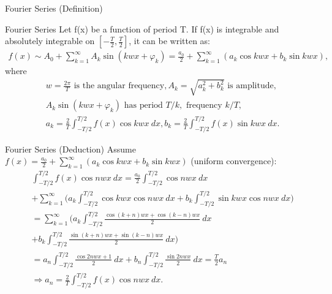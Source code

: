 \documentclass{beamer}
\begin{document}
	\begin{frame}{Fourier Series (Definition)}
		\begin{block}{Fourier Series}
			Let f(x) be a function of period T. If f(x) is integrable and absolutely integrable on $[-\frac{T}{2}, \frac{T}{2}]$, it can be written as:
			\begin{align*}
				f(x) \sim A_0 + \sum_{k=1}^{\infty}A_k\sin (kwx + \varphi_k) = \frac{a_0}{2} + \sum_{k=1}^{\infty}(a_k\cos kwx + b_k\sin kwx),
			\end{align*}
			where
			\begin{align*}
				& w=\frac{2\pi}{T} \text{ is the angular frequency}, A_k = \sqrt{a_k^2 + b_k^2} \text{ is amplitude},\\
				& A_k\sin (kwx + \varphi_k)\text{ has period } T/k,\text{ frequency } k/T,\\
				& a_k = \frac{2}{T} \int_{-T/2}^{T/2}f(x)\cos kwx\ dx, b_k = \frac{2}{T} \int_{-T/2}^{T/2}f(x)\sin kwx\ dx.
			\end{align*}
		\end{block}
	\end{frame}
	\begin{frame}{Fourier Series (Deduction)}
		Assume $f(x) = \frac{a_0}{2} + \sum_{k=1}^{\infty}(a_k\cos kwx + b_k\sin kwx)$ (uniform convergence):
		\begin{align*}
			& \int_{-T/2}^{T/2}f(x)\cos nwx\ dx = \frac{a_0}{2}\int_{-T/2}^{T/2} \cos nwx\ dx \\
			& + \sum_{k=1}^{\infty}\big(a_k\int_{-T/2}^{T/2}\cos kwx \cos nwx\ dx + b_k\int_{-T/2}^{T/2}\sin kwx \cos nwx\ dx\big) \\
			& = \sum_{k=1}^{\infty}\big(a_k\int_{-T/2}^{T/2}\frac{\cos (k+n)wx + \cos (k-n)wx}{2}\ dx \\
			& + b_k\int_{-T/2}^{T/2}\frac{\sin (k+n)wx + \sin (k-n)wx}{2}\ dx\big) \\
			& = a_n\int_{-T/2}^{T/2}\frac{\cos 2nwx + 1}{2}\ dx + b_n\int_{-T/2}^{T/2}\frac{\sin 2nwx}{2}\ dx = \frac{T}{2}a_n \\
			& \Longrightarrow a_n = \frac{2}{T} \int_{-T/2}^{T/2}f(x)\cos nwx\ dx.
		\end{align*}
	\end{frame}
\end{document}
